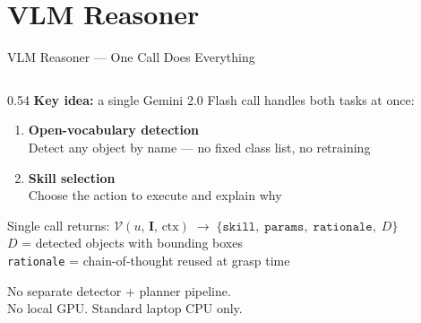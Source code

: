 \documentclass[aspectratio=169, 10pt]{beamer}
\begin{document}
\section{VLM Reasoner}

\begin{frame}{VLM Reasoner --- One Call Does Everything}
  \begin{columns}[T]
    \begin{column}{0.54\textwidth}
      \textbf{Key idea:} a single Gemini 2.0 Flash call handles
      both tasks at once:

      \vspace{0.3em}
      \begin{enumerate}\small
        \item \textbf{Open-vocabulary detection}\\
              Detect any object by name ---
              no fixed class list, no retraining
        \item \textbf{Skill selection}\\
              Choose the action to execute and explain why
      \end{enumerate}

      \vspace{0.3em}
      \begin{block}{Single call returns:}
        \small
        $\mathcal{V}(u,\,\mathbf{I},\,\text{ctx})
         \;\to\;
         \{\texttt{skill},\;\texttt{params},\;\texttt{rationale},\;D\}$\\[0.2em]
        $D$ = detected objects with bounding boxes\\
        \texttt{rationale} = chain-of-thought reused at grasp time
      \end{block}

      \vspace{0.2em}
      {\small\color{upecgray}
        No separate detector + planner pipeline.\\
        No local GPU. Standard laptop CPU only.}
    \end{column}


\end{columns}
\end{frame}
\end{document}
